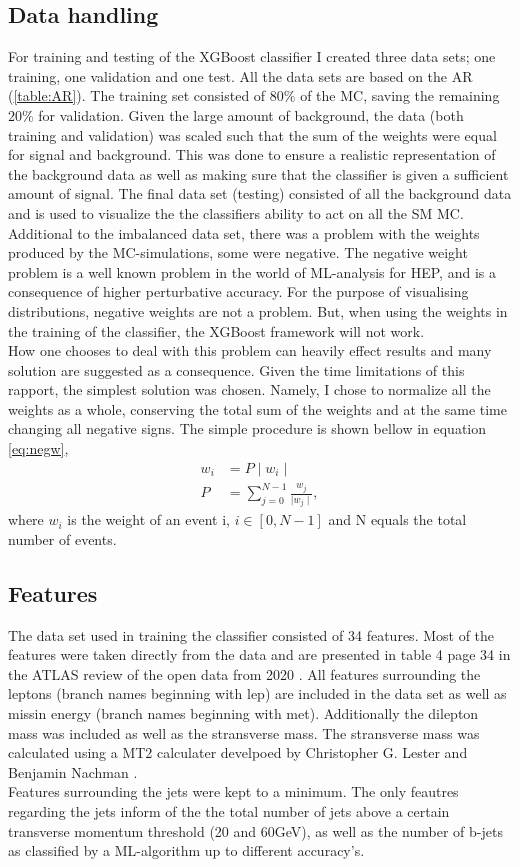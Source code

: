 \documentclass{article}
\begin{document}
\subsection{Data handling}\label{sec:DH}
For training and testing of the XGBoost classifier I created three data sets; one training, one validation and one test. All the data sets are based on the AR (\ref{table:AR}). The training set consisted of $80\%$ of the MC, saving the remaining $20\%$ for validation. Given the large amount of background, the data (both training and validation) was scaled such that the sum of the weights were equal for signal and background. This was done to ensure a realistic representation of the background data as well as making sure that the classifier is given a sufficient amount of signal. The final data set (testing) consisted of all the background data and is used to visualize the the classifiers ability to act on all the SM MC.
\\
Additional to the imbalanced data set, there was a problem with the weights produced by the MC-simulations, some were negative. The negative weight problem is a well known problem in the world of ML-analysis for HEP, and is a consequence of higher perturbative accuracy. For the purpose of visualising distributions, negative weights are not a problem. But, when using the weights in the training of the classifier, the XGBoost framework will not work. 
\\
How one chooses to deal with this problem can heavily effect results and many solution are suggested as a consequence. Given the time limitations of this rapport, the simplest solution was chosen. Namely, I chose to normalize all the weights as a whole, conserving the total sum of the weights and at the same time changing all negative signs. The simple procedure is shown bellow in equation \ref{eq:negw},
\begin{align}\label{eq:negw}
    w_i & = P \mid w_i \mid\,  \\
    P  & =  \sum_{j=0}^{N-1}\frac{ w_j}{\mid w_j \mid},
\end{align}
where $w_i$ is the weight of an event i, $i \in [0,N-1]$ and N equals the total number of events.
\subsection{Features}
The data set used in training the classifier consisted of 34 features. Most of the features were taken directly from the data and are presented in table 4 page 34 in the ATLAS review of the open data from 2020 \cite{ATL-OREACH-PUB-2020-001}. All features surrounding the leptons (branch names beginning with lep) are included in the data set as well as missin energy (branch names beginning with met). Additionally the dilepton mass was included as well as the stransverse mass. The stransverse mass was calculated using a MT2 calculater develpoed by Christopher G. Lester and Benjamin Nachman \cite{Lester_2015}.
\\
Features surrounding the jets were kept to a minimum. The only feautres regarding the jets inform of the the total number of jets above a certain transverse momentum threshold (20 and 60GeV), as well as the number of b-jets as classified by a ML-algorithm up to different accuracy's.
\end{document}
